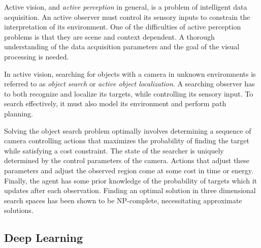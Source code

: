 Active vision, and \textit{active perception} in general, is a problem of intelligent data acquisition.
An active observer must control its sensory inputs to constrain the interpretation of its environment.
One of the difficulties of active perception problems is that they are scene and context dependent.
A thorough understanding of the data acquisition parameters and the goal of the visual processing is needed.~\cite{bajcsy_active_1988}




In active vision, searching for objects with a camera in unknown environments is referred to as \textit{object search} or \textit{active object localization}.
A searching observer has to both recognize and localize its targets, while controlling its sensory input.
To search effectively, it must also model its environment and perform path planning.~\cite{chen_activevisionsurvey_2011}

Solving the object search problem optimally involves determining a sequence of camera controlling actions that maximizes the probability of finding the target while satisfying a cost constraint.
The state of the searcher is uniquely determined by the control parameters of the camera.
Actions that adjust these parameters and adjust the observed region come at some cost in time or energy.
Finally, the agent has some prior knowledge of the probability of targets which it updates after each observation.
Finding an optimal solution in three dimensional search spaces has been shown to be NP-complete, necessitating approximate solutions.~\cite{ye_tsotsos_2001,andreopoulos_tsotsos_theory_2009}

\subsection{Deep Learning}
\label{sec:deeplearning}

